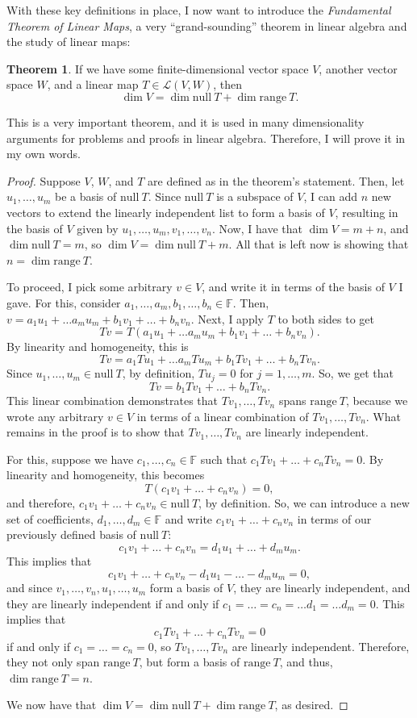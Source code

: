 \documentclass{article}
\renewcommand{\L}{\mathcal{L}}
\newcommand{\nulls}{\mathrm{null}}
\newcommand{\range}{\mathrm{range}\ }
\newcommand{\F}{\mathbb{F}}
\theoremstyle{definition}
\newtheorem{theorem}{Theorem}
\begin{document}
With these key definitions in place, I now want to introduce the \textit{Fundamental Theorem of Linear Maps}, a very ``grand-sounding'' theorem in linear algebra and the study of linear maps:
\begin{theorem}\label{thm: fundamental-theorem-linear-maps}
    If we have some finite-dimensional vector space $V$, another vector space $W$, and a linear map $T \in \L(V, W)$, then $$\dim V = \dim \nulls\ T + \dim \range T.$$
\end{theorem}
This is a very important theorem, and it is used in many dimensionality arguments for problems and proofs in linear algebra. Therefore, I will prove it in my own words. 
\begin{proof}
    Suppose $V$, $W$, and $T$ are defined as in the theorem's statement. Then, let $u_1, \dots, u_m$ be a basis of $\nulls\ T$. Since $\nulls\ T$ is a subspace of $V$, I can add $n$ new vectors to extend the linearly independent list to form a basis of $V$, resulting in the basis of $V$ given by $u_1, \dots, u_m, v_1, \dots, v_n$. Now, I have that $\dim V = m + n$, and $\dim \nulls\ T = m$, so $\dim V = \dim \nulls\ T + m$. All that is left now is showing that $n = \dim \range T$. 

    To proceed, I pick some arbitrary $v \in V$, and write it in terms of the basis of $V$ I gave. For this, consider $a_1, \dots, a_m, b_1, \dots, b_n \in \F$. Then, $v = a_1u_1 + \dots a_mu_m + b_1v_1 + \dots + b_nv_n$. Next, I apply $T$ to both sides to get $$Tv = T(a_1u_1 + \dots a_mu_m + b_1v_1 + \dots + b_nv_n).$$ By linearity and homogeneity, this is $$Tv = a_1Tu_1 + \dots a_mTu_m + b_1Tv_1 + \dots + b_nTv_n.$$ Since $u_1, \dots, u_m \in \nulls\ T$, by definition, $Tu_j = 0$ for $j = 1, \dots, m$. So, we get that $$Tv = b_1Tv_1 + \dots + b_nTv_n.$$ This linear combination demonstrates that $Tv_1, \dots, Tv_n$ spans $\range T$, because we wrote any arbitrary $v \in V$ in terms of a linear combination of $Tv_1, \dots, Tv_n$. What remains in the proof is to show that $Tv_1, \dots, Tv_n$ are linearly independent. 

    For this, suppose we have $c_1, \dots, c_n \in \F$ such that $c_1Tv_1 + \dots + c_nTv_n = 0$. By linearity and homogeneity, this becomes $$T(c_1v_1 + \dots + c_nv_n) = 0,$$ and therefore, $c_1v_1 + \dots + c_nv_n \in \nulls\ T$, by definition. So, we can introduce a new set of coefficients, $d_1, \dots, d_m \in \F$ and write $c_1v_1 + \dots + c_nv_n$ in terms of our previously defined basis of $\nulls\ T$: $$c_1v_1 + \dots + c_nv_n = d_1u_1 + \dots + d_mu_m.$$ This implies that $$c_1v_1 + \dots + c_nv_n - d_1u_1 - \dots - d_mu_m = 0,$$ and since $v_1, \dots, v_n, u_1, \dots, u_m$ form a basis of $V$, they are linearly independent, and they are linearly independent if and only if $c_1 = \dots = c_n = \dots d_1 = \dots d_m = 0$. This implies that $$c_1Tv_1 + \dots + c_nTv_n = 0$$ if and only if $c_1 = \dots = c_n = 0$, so $Tv_1, \dots, Tv_n$ are linearly independent. Therefore, they not only span $\range T$, but form a basis of $\range T$, and thus, $\dim \range T = n$.

    We now have that $\dim V = \dim \nulls\ T + \dim \range T$, as desired. 
\end{proof}
\end{document}
